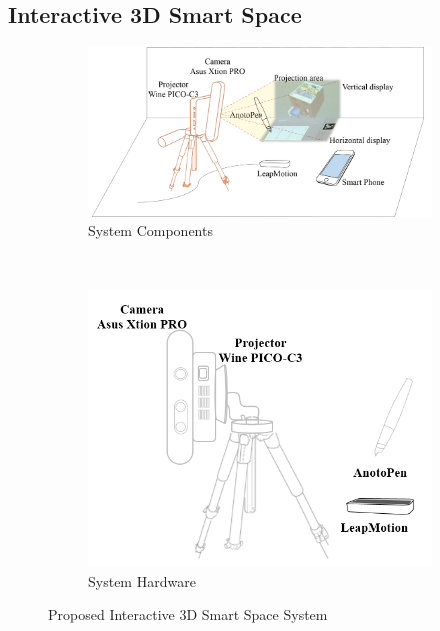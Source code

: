 \subsection{Interactive 3D Smart Space}
\begin{figure}[!ht]
	\centering
        \begin{subfigure}[b]{1.0\columnwidth}
            \centering
            \includegraphics[width=\textwidth]{3-System/system_overview}
                \caption{System Components}
                \label{fig:port3dar}
        \end{subfigure}
        \\
        \begin{subfigure}[b]{1.0\columnwidth}
	        \centering
              \includegraphics[width=0.7\columnwidth]{3-System/Hardware}
              \caption{System Hardware}
              \label{fig:hardware}
        \end{subfigure}%
	\caption{Proposed Interactive 3D Smart Space System}
    \label{fig:system}
\end{figure}
